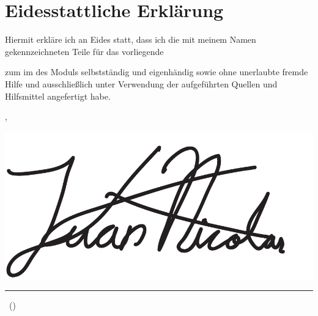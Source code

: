 %
\section*{Eidesstattliche Erklärung}
Hiermit erkläre ich an Eides statt, dass ich die mit meinem Namen gekennzeichneten Teile für das vorliegende \textit{\art}
\bigskip
%
\begin{center}
  \large{\textsc{\titel}}
\end{center}
%
\bigskip
zum \textit{\termin} im \textit{\veranstaltung} des Moduls \textit{\modul} selbstständig und eigenhändig sowie ohne unerlaubte fremde Hilfe und ausschließlich unter Verwendung der aufgeführten Quellen und Hilfsmittel angefertigt habe.

\bigskip

\ort , \abgabedatumKurz

\bigskip
\bigskip
\includegraphics[scale=0.3]{setup/kjuan.pdf}\mbox{}
\vspace{-1.0cm}\\
\rule[-0.2cm]{8cm}{0.5pt}

\textsc{\autorA\ (\matrikelnrA)}
%
%
%
%
%

%
%
%
\newpage